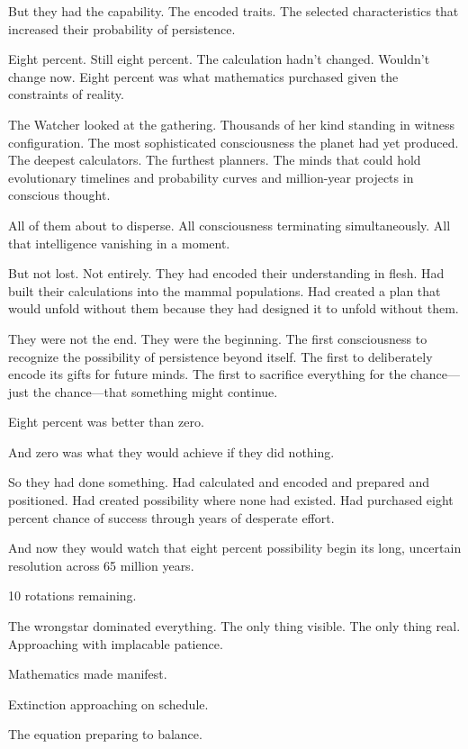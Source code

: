 But they had the capability. The encoded traits. The selected characteristics that increased their probability of persistence.

Eight percent. Still eight percent. The calculation hadn't changed. Wouldn't change now. Eight percent was what mathematics purchased given the constraints of reality.

The Watcher looked at the gathering. Thousands of her kind standing in witness configuration. The most sophisticated consciousness the planet had yet produced. The deepest calculators. The furthest planners. The minds that could hold evolutionary timelines and probability curves and million-year projects in conscious thought.

All of them about to disperse. All consciousness terminating simultaneously. All that intelligence vanishing in a moment.

But not lost. Not entirely. They had encoded their understanding in flesh. Had built their calculations into the mammal populations. Had created a plan that would unfold without them because they had designed it to unfold without them.

They were not the end. They were the beginning. The first consciousness to recognize the possibility of persistence beyond itself. The first to deliberately encode its gifts for future minds. The first to sacrifice everything for the chance—just the chance—that something might continue.

Eight percent was better than zero.

And zero was what they would achieve if they did nothing.

So they had done something. Had calculated and encoded and prepared and positioned. Had created possibility where none had existed. Had purchased eight percent chance of success through years of desperate effort.

And now they would watch that eight percent possibility begin its long, uncertain resolution across 65 million years.

10 rotations remaining.

The wrongstar dominated everything. The only thing visible. The only thing real. Approaching with implacable patience.

Mathematics made manifest.

Extinction approaching on schedule.

The equation preparing to balance.

